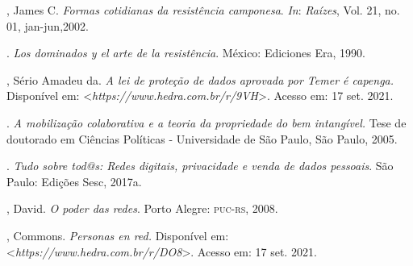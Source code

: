 \begin{bibliohedra}
, James C. \emph{Formas cotidianas da resistência camponesa}. \emph{In}:
\emph{Raízes}, Vol. 21, no. 01, jan-jun,2002.

\titidem. \emph{Los dominados y el arte de la resistência}.
México: Ediciones Era, 1990.

, Sério Amadeu da. \emph{A lei de proteção de dados aprovada
por Temer é capenga.} Disponível em: \textless{}\emph{https://www.hedra.com.br/r/9VH}\textgreater{}. Acesso em: 17 set. 2021.

\titidem. \emph{A mobilização colaborativa e a
teoria da propriedade do bem intangível.} Tese de doutorado em Ciências
Políticas - Universidade de São Paulo, São Paulo, 2005.

\titidem. \emph{Tudo sobre tod@s: Redes digitais,
privacidade e venda de dados pessoais}. São Paulo: Edições Sesc, 2017a.

, David. \emph{O poder das redes}. Porto Alegre: \textsc{puc-rs}, 2008.

, Commons. \emph{Personas en red.} Disponível em:
\textless{}\emph{https://www.hedra.com.br/r/DO8}\textgreater{}. Acesso em: 17 set. 2021.
\end{bibliohedra}

